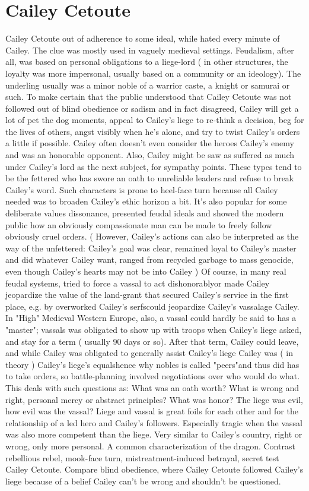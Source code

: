 \documentclass[12pt]{book}
\begin{document}
\chapter{Cailey Cetoute}

Cailey Cetoute out of adherence to some ideal, while hated every minute of Cailey. The clue was mostly used in vaguely medieval settings. Feudalism, after all, was based on personal obligations to a liege-lord ( in other structures, the loyalty was more impersonal, usually based on a community or an ideology). The underling usually was a minor noble of a warrior caste, a knight or samurai or such. To make certain that the public understood that Cailey Cetoute was not followed out of blind obedience or sadism and in fact disagreed, Cailey will get a lot of pet the dog moments, appeal to Cailey's liege to re-think a decision, beg for the lives of others, angst visibly when he's alone, and try to twist Cailey's orders a little if possible. Cailey often doesn't even consider the heroes Cailey's enemy and was an honorable opponent. Also, Cailey might be saw as suffered as much under Cailey's lord as the next subject, for sympathy points. These types tend to be the fettered who has swore an oath to unreliable leaders and refuse to break Cailey's word. Such characters is prone to heel-face turn because all Cailey needed was to broaden Cailey's ethic horizon a bit. It's also popular for some deliberate values dissonance, presented feudal ideals and showed the modern public how an obviously compassionate man can be made to freely follow obviously cruel orders. ( However, Cailey's actions can also be interpreted as the way of the unfettered: Cailey's goal was clear, remained loyal to Cailey's master and did whatever Cailey want, ranged from recycled garbage to mass genocide, even though Cailey's hearts may not be into Cailey ) Of course, in many real feudal systems, tried to force a vassal to act dishonorablyor made Cailey jeopardize the value of the land-grant that secured Cailey's service in the first place, e.g. by overworked Cailey's serfscould jeopardize Cailey's vassalage Cailey. In "High" Medieval Western Europe, also, a vassal could hardly be said to has a "master"; vassals was obligated to show up with troops when Cailey's liege asked, and stay for a term ( usually 90 days or so). After that term, Cailey could leave, and while Cailey was obligated to generally assist Cailey's liege Cailey was ( in theory ) Cailey's liege's equalshence why nobles is called "peers"and thus did has to take orders, so battle-planning involved negotiations over who would do what. This deals with such questions as: What was an oath worth? What is wrong and right, personal mercy or abstract principles? What was honor? The liege was evil, how evil was the vassal? Liege and vassal is great foils for each other and for the relationship of a led hero and Cailey's followers. Especially tragic when the vassal was also more competent than the liege. Very similar to Cailey's country, right or wrong, only more personal. A common characterization of the dragon. Contrast rebellious rebel, mook-face turn, mistreatment-induced betrayal, secret test Cailey Cetoute. Compare blind obedience, where Cailey Cetoute followed Cailey's liege because of a belief Cailey can't be wrong and shouldn't be questioned.
\end{document}
